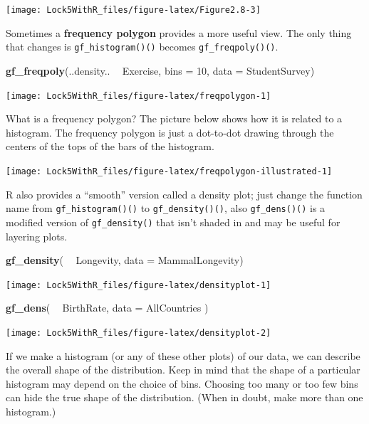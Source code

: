 \documentclass[]{book}
\newenvironment{Shaded}{\begin{snugshade}}{\end{snugshade}}
\newcommand{\DataTypeTok}[1]{\textcolor[rgb]{0.13,0.29,0.53}{#1}}
\newcommand{\DecValTok}[1]{\textcolor[rgb]{0.00,0.00,0.81}{#1}}
\newcommand{\KeywordTok}[1]{\textcolor[rgb]{0.13,0.29,0.53}{\textbf{#1}}}
\newcommand{\NormalTok}[1]{#1}
\newcommand{\OperatorTok}[1]{\textcolor[rgb]{0.81,0.36,0.00}{\textbf{#1}}}
\newcommand{\StringTok}[1]{\textcolor[rgb]{0.31,0.60,0.02}{#1}}
\begin{document}
\texttt{[image: Lock5WithR\_files/figure-latex/Figure2.8-3]}

Sometimes a \textbf{frequency polygon} provides a more useful view.
The only thing that changes is \texttt{gf\_histogram()()} becomes \texttt{gf\_freqpoly()()}.

\begin{Shaded}
\begin{Highlighting}[]
\KeywordTok{gf_freqpoly}\NormalTok{(..density.. }\OperatorTok{~}\StringTok{ }\NormalTok{Exercise, }\DataTypeTok{bins =} \DecValTok{10}\NormalTok{, }\DataTypeTok{data =}\NormalTok{ StudentSurvey)}
\end{Highlighting}
\end{Shaded}

\texttt{[image: Lock5WithR\_files/figure-latex/freqpolygon-1]}

What is a frequency polygon? The picture below shows how it is related to a histogram. The frequency polygon is just a dot-to-dot drawing through the centers of the tops of the bars of the histogram.

\texttt{[image: Lock5WithR\_files/figure-latex/freqpolygon-illustrated-1]}

R also provides a ``smooth'' version called a density plot; just change the function name from \texttt{gf\_histogram()()} to \texttt{gf\_density()()}, also \texttt{gf\_dens()()} is a modified version of \texttt{gf\_density()} that isn't shaded in and may be useful for layering plots.

\begin{Shaded}
\begin{Highlighting}[]
\KeywordTok{gf_density}\NormalTok{( }\OperatorTok{~}\StringTok{ }\NormalTok{Longevity, }\DataTypeTok{data =}\NormalTok{ MammalLongevity)}
\end{Highlighting}
\end{Shaded}

\texttt{[image: Lock5WithR\_files/figure-latex/densityplot-1]}

\begin{Shaded}
\begin{Highlighting}[]
\KeywordTok{gf_dens}\NormalTok{( }\OperatorTok{~}\StringTok{ }\NormalTok{BirthRate, }\DataTypeTok{data =}\NormalTok{ AllCountries )}
\end{Highlighting}
\end{Shaded}

\texttt{[image: Lock5WithR\_files/figure-latex/densityplot-2]}

If we make a histogram (or any of these other plots) of our data, we can describe the overall shape of the distribution. Keep in mind that the shape of a particular histogram may depend on the choice of bins. Choosing too many or too few bins can hide the true shape of the distribution. (When in doubt, make more than one histogram.)
\end{document}
